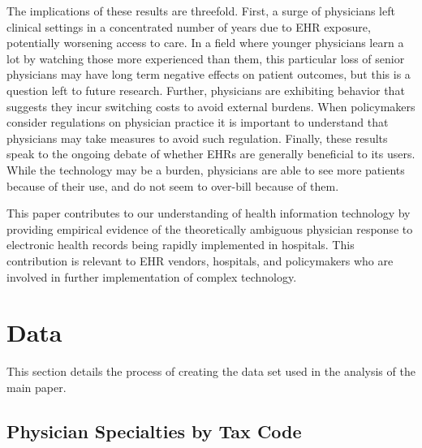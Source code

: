 \documentclass[12pt]{article}
\begin{document}
The implications of these results are threefold. First, a surge of physicians left clinical settings in a concentrated number of years due to EHR exposure, potentially worsening access to care. In a field where younger physicians learn a lot by watching those more experienced than them, this particular loss of senior physicians may have long term negative effects on patient outcomes, but this is a question left to future research. Further, physicians are exhibiting behavior that suggests they incur switching costs to avoid external burdens. When policymakers consider regulations on physician practice it is important to understand that physicians may take measures to avoid such regulation. Finally, these results speak to the ongoing debate of whether EHRs are generally beneficial to its users. While the technology may be a burden, physicians are able to see more patients because of their use, and do not seem to over-bill because of them. 

This paper contributes to our understanding of health information technology by providing empirical evidence of the theoretically ambiguous physician response to electronic health records being rapidly implemented in hospitals. This contribution is relevant to EHR vendors, hospitals, and policymakers who are involved in further implementation of complex technology. 




\clearpage

\renewcommand*{\bibfont}{\footnotesize}

\printbibliography

\clearpage


\appendix

\section{Data}\label{app:data}

This section details the process of creating the data set used in the analysis of the main paper. 

\subsection{Physician Specialties by Tax Code}\label{sec:taxcode}
\end{document}
